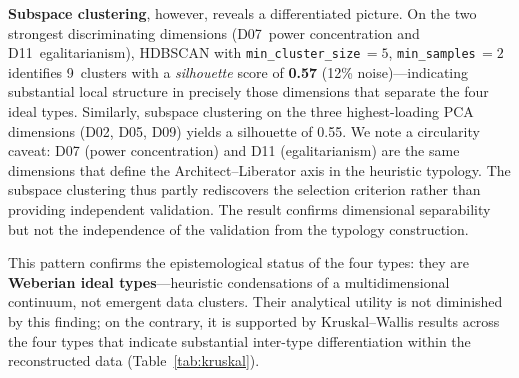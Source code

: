 \documentclass[12pt,a4paper]{article}
\begin{document}
\textbf{Subspace clustering}, however, reveals a differentiated picture. On the two strongest discriminating dimensions (D07~power concentration and D11~egalitarianism), HDBSCAN with \texttt{min\_cluster\_size}$\,=5$, \texttt{min\_samples}$\,=2$ identifies 9~clusters with a \emph{silhouette} score of \textbf{0.57} (12\% noise)---indicating substantial local structure in precisely those dimensions that separate the four ideal types. Similarly, subspace clustering on the three highest-loading PCA dimensions (D02, D05, D09) yields a silhouette of 0.55. We note a circularity caveat: D07 (power concentration) and D11 (egalitarianism) are the same dimensions that define the Architect--Liberator axis in the heuristic typology. The subspace clustering thus partly rediscovers the selection criterion rather than providing independent validation. The result confirms dimensional separability but not the independence of the validation from the typology construction.

This pattern confirms the epistemological status of the four types: they are \textbf{Weberian ideal types}---heuristic condensations of a multidimensional continuum, not emergent data clusters. Their analytical utility is not diminished by this finding; on the contrary, it is supported by Kruskal--Wallis results across the four types that indicate substantial inter-type differentiation within the reconstructed data (Table~\ref{tab:kruskal}).
\end{document}
